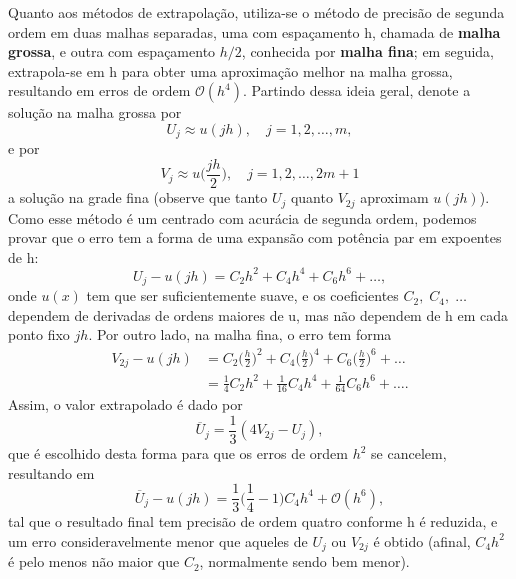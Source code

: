 \documentclass[../differential_methods.tex]{subfiles}
\begin{document}
Quanto aos métodos de extrapolação, utiliza-se o método de precisão de segunda ordem em duas malhas separadas, uma com espaçamento h, chamada de \textbf{malha grossa}, e outra com espaçamento \(h/2\), conhecida por \textbf{malha fina}; em seguida, extrapola-se em h para obter uma aproximação melhor na malha grossa, resultando em erros de ordem \(\mathcal{O}(h^{4})\). Partindo dessa ideia geral, denote a solução na malha grossa por
\[
	U_{j}\approx u(jh), \quad j=1,2,\dotsc , m,
\]
e por
\[
	V_{j}\approx u\biggl(\frac{jh}{2}\biggr), \quad j=1,2,\dotsc , 2m+1
\]
a solução na grade fina (observe que tanto \(U_{j}\) quanto \(V_{2j}\) aproximam \(u(jh)\)). Como esse método é um centrado com acurácia de segunda ordem, podemos provar que o erro tem a forma de uma expansão com potência par em expoentes de h:
\[
	U_{j}-u(jh)=C_{2}h^{2}+C_{4}h^{4}+C_{6}h^{6}+\dotsc ,
\]
onde \(u(x)\) tem que ser suficientemente suave, e os coeficientes \(C_{2},\; C_{4},\; \dotsc \) dependem de derivadas de ordens maiores de u, mas não dependem de h em cada ponto fixo \(jh\). Por outro lado, na malha fina, o erro tem forma
\begin{align*}
	V_{2j}-u(jh) & =C_{2}\biggl(\frac{h}{2}\biggr)^{2} + C_{4}\biggl(\frac{h}{2}\biggr)^{4} + C_{6}\biggl(\frac{h}{2}\biggr)^{6} + \dotsc \\
	             & = \frac{1}{4}C_{2}h^{2}+\frac{1}{16}C_{4}h^{4}+\frac{1}{64}C_{6}h^{6}+\dotsc .
\end{align*}
Assim, o valor extrapolado é dado por
\[
	\overline{U}_{j}=\frac{1}{3}(4 V_{2j}-U_{j}),
\]
que é escolhido desta forma para que os erros de ordem \(h^{2}\) se cancelem, resultando em
\[
	\overline{U}_{j}-u(jh)=\frac{1}{3}\biggl(\frac{1}{4}-1\biggr)C_{4}h^{4}+\mathcal{O}(h^{6}),
\]
tal que o resultado final tem precisão de ordem quatro conforme h é reduzida, e um erro consideravelmente menor que aqueles de \(U_{j}\) ou \(V_{2j}\) é obtido (afinal, \(C_{4}h^{2}\) é pelo menos não maior que \(C_{2}\), normalmente sendo bem menor).
\end{document}
